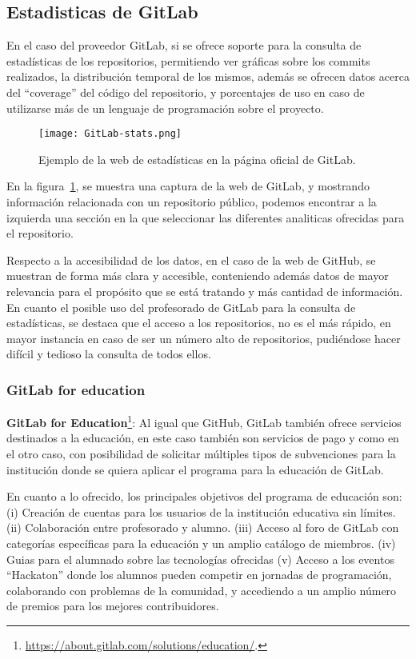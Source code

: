 \subsection{Estadisticas de GitLab}

En el caso del proveedor GitLab, si se ofrece soporte para la consulta de
estadísticas de los repositorios, permitiendo ver gráficas sobre los
commits realizados, la distribución temporal de los mismos, además se
ofrecen datos acerca del ``coverage'' del código del repositorio, y
porcentajes de uso en caso de utilizarse más de un lenguaje de programación
sobre el proyecto.

\begin{figure}[h!]
  \texttt{[image: GitLab-stats.png]}
  \caption{Ejemplo de la web de estadísticas en la página oficial de
    GitLab.}
  \label{figure:GitLabInsights}
\end{figure}

En la figura~\ref{figure:GitLabInsights}, se muestra una captura de la web
de GitLab, y mostrando información relacionada con un repositorio público,
podemos encontrar a la izquierda una sección en la que seleccionar las
diferentes analiticas ofrecidas para el repositorio.

Respecto a la accesibilidad de los datos, en el caso de la web de GitHub,
se muestran de forma más clara y accesible, conteniendo además datos de
mayor relevancia para el propósito que se está tratando y más cantidad de
información. En cuanto el posible uso del profesorado de GitLab para la
consulta de estadísticas, se destaca que el acceso a los repositorios, no
es el más rápido, en mayor instancia en caso de ser un número alto de
repositorios, pudiéndose hacer difícil y tedioso la consulta de todos
ellos.

\subsubsection{GitLab for education}

\textbf{GitLab for
  Education}\footnote{\url{https://about.gitlab.com/solutions/education/}.}:
Al igual que GitHub, GitLab también ofrece servicios destinados a la
educación, en este caso también son servicios de pago y como en el otro
caso, con posibilidad de solicitar múltiples tipos de subvenciones para la
institución donde se quiera aplicar el programa para la educación de
GitLab.

En cuanto a lo ofrecido, los principales objetivos del programa de
educación son: (i) Creación de cuentas para los usuarios de la institución
educativa sin límites. (ii) Colaboración entre profesorado y alumno. (iii)
Acceso al foro de GitLab con categorías específicas para la educación y un
amplio catálogo de miembros. (iv) Guias para el alumnado sobre las
tecnologías ofrecidas (v) Acceso a los eventos “Hackaton” donde los alumnos
pueden competir en jornadas de programación, colaborando con problemas de
la comunidad, y accediendo a un amplio número de premios para los mejores
contribuidores.



